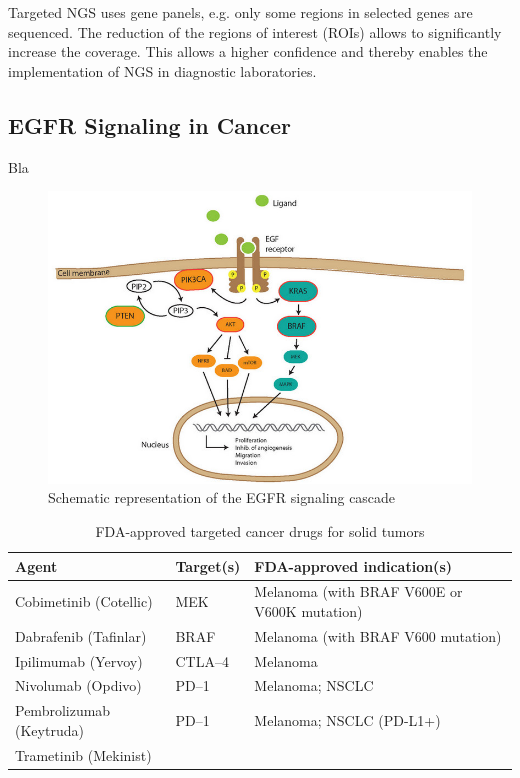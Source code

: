 Targeted NGS uses gene panels, e.g. only some regions in selected genes are
sequenced. The reduction of the regions of interest (ROIs) allows to
significantly increase the coverage. This allows a higher confidence and thereby
enables the implementation of NGS in diagnostic laboratories.

\subsection{EGFR Signaling in Cancer}

Bla {\cite{targeting_egfr:2012}}

\begin{figure}[ht]
  \begin{center}
    \includegraphics[scale=2,angle=0]{egfr_signaling.png}
    \caption{Schematic representation of the EGFR signaling cascade {\cite{targeting_egfr:2012}}}
    \label{Fig:egfr_signaling}
  \end{center}
\end{figure}

\begin{table}[!htbp]
    \caption[Targeted Cancer Agents]{FDA-approved targeted cancer drugs for solid tumors}
    \centering
    \begin{tabular}{ |p{4.5cm}|p{2cm}|p{4.5cm}|}
    \hline
    Agent & Target(s) & FDA-approved indication(s) \\ \hline \hline
    Cobimetinib (Cotellic) & MEK & Melanoma (with BRAF V600E or V600K mutation) \\
    Dabrafenib (Tafinlar) & BRAF & Melanoma (with BRAF V600 mutation) \\
    Ipilimumab (Yervoy) & CTLA--4 & Melanoma \\
    Nivolumab (Opdivo) & PD--1 & Melanoma; NSCLC \\
    Pembrolizumab (Keytruda) & PD--1 & Melanoma; NSCLC (PD-L1+) \\
    Trametinib (Mekinist) &
    \hline
  \end{tabular}
\end{table}

